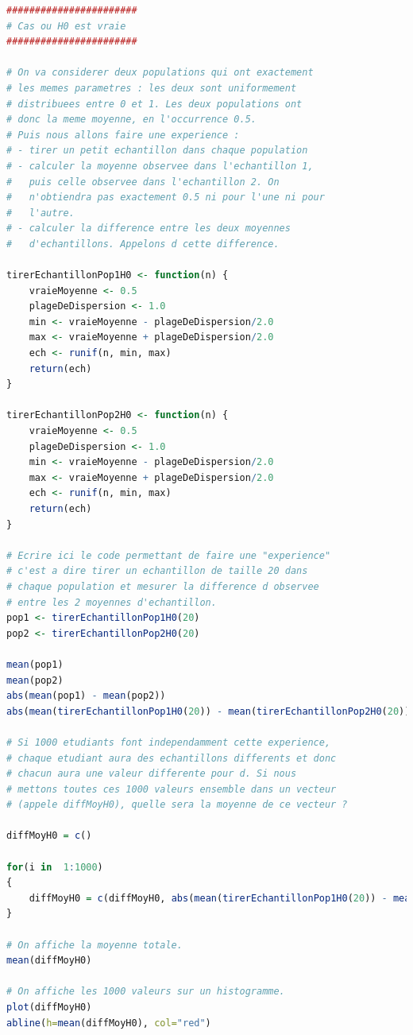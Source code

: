 \begin{lstlisting}[language=R]
#######################
# Cas ou H0 est vraie 
####################### 

# On va considerer deux populations qui ont exactement
# les memes parametres : les deux sont uniformement 
# distribuees entre 0 et 1. Les deux populations ont
# donc la meme moyenne, en l'occurrence 0.5. 
# Puis nous allons faire une experience : 
# - tirer un petit echantillon dans chaque population
# - calculer la moyenne observee dans l'echantillon 1,
#   puis celle observee dans l'echantillon 2. On 
#   n'obtiendra pas exactement 0.5 ni pour l'une ni pour 
#   l'autre.
# - calculer la difference entre les deux moyennes 
#   d'echantillons. Appelons d cette difference.

tirerEchantillonPop1H0 <- function(n) {
	vraieMoyenne <- 0.5
	plageDeDispersion <- 1.0
	min <- vraieMoyenne - plageDeDispersion/2.0
	max <- vraieMoyenne + plageDeDispersion/2.0
	ech <- runif(n, min, max)
	return(ech)
}

tirerEchantillonPop2H0 <- function(n) {
	vraieMoyenne <- 0.5
	plageDeDispersion <- 1.0
	min <- vraieMoyenne - plageDeDispersion/2.0
	max <- vraieMoyenne + plageDeDispersion/2.0
	ech <- runif(n, min, max)
	return(ech)
}

# Ecrire ici le code permettant de faire une "experience"
# c'est a dire tirer un echantillon de taille 20 dans 
# chaque population et mesurer la difference d observee
# entre les 2 moyennes d'echantillon.
pop1 <- tirerEchantillonPop1H0(20)
pop2 <- tirerEchantillonPop2H0(20)

mean(pop1)
mean(pop2)
abs(mean(pop1) - mean(pop2))
abs(mean(tirerEchantillonPop1H0(20)) - mean(tirerEchantillonPop2H0(20)))

# Si 1000 etudiants font independamment cette experience,
# chaque etudiant aura des echantillons differents et donc
# chacun aura une valeur differente pour d. Si nous 
# mettons toutes ces 1000 valeurs ensemble dans un vecteur
# (appele diffMoyH0), quelle sera la moyenne de ce vecteur ?

diffMoyH0 = c()

for(i in  1:1000)
{
	diffMoyH0 = c(diffMoyH0, abs(mean(tirerEchantillonPop1H0(20)) - mean(tirerEchantillonPop2H0(20))))
}

# On affiche la moyenne totale.
mean(diffMoyH0)

# On affiche les 1000 valeurs sur un histogramme.
plot(diffMoyH0)
abline(h=mean(diffMoyH0), col="red")

\end{lstlisting}

